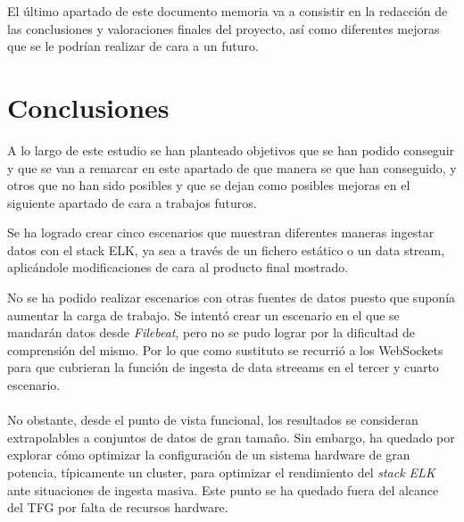 
El último apartado de este documento memoria va a consistir en la redacción de las conclusiones y valoraciones finales del proyecto, así como diferentes mejoras que se le podrían realizar de cara a un futuro.

\section{Conclusiones}

A lo largo de este estudio se han planteado objetivos que se han podido conseguir y que se van a remarcar en este apartado de que manera se que han conseguido, y otros que no han sido posibles y que se dejan como posibles mejoras en el siguiente apartado de cara a trabajos futuros.

Se ha logrado crear cinco escenarios que muestran diferentes maneras ingestar datos con el stack ELK, ya sea a través de un fichero estático o un data stream, aplicándole modificaciones de cara al producto final mostrado.

No se ha podido realizar escenarios con otras fuentes de datos puesto que suponía aumentar la carga de trabajo. Se intentó crear un escenario en el que se mandarán datos desde \textit{Filebeat}, pero no se pudo lograr por la dificultad de comprensión del mismo. Por lo que como sustituto se recurrió a los WebSockets para que cubrieran la función de ingesta de data streeams en el tercer y cuarto escenario. 

\paragraph{}
\paragraph{}
\paragraph{}

No obstante, desde el punto de vista funcional, los resultados se consideran extrapolables a conjuntos de datos de gran tamaño. Sin embargo, ha quedado por explorar cómo optimizar la configuración de un sistema hardware de gran potencia, típicamente un cluster, para optimizar el rendimiento del \textit{stack ELK} ante situaciones de ingesta masiva. Este punto se ha quedado fuera del alcance del TFG por falta de recursos hardware. 

